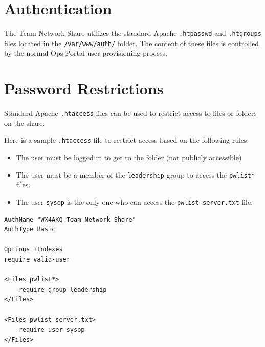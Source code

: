 \documentclass[pdflatex,letterpaper,twoside,12pt]{book}
\begin{document}

\section{Authentication}

The Team Network Share utilizes the standard Apache \texttt{.htpasswd} and \texttt{.htgroups} files located in the \texttt{/var/www/auth/} folder.  The content of these files is controlled by the normal Ops Portal user provisioning process.


\section{Password Restrictions}

Standard Apache \texttt{.htaccess} files can be used to restrict access to files or folders on the share.

Here is a sample \texttt{.htaccess} file to restrict access based on the following rules:

\begin{itemize}
\item The user must be logged in to get to the folder (not publicly accessible)
\item The user must be a member of the \texttt{leadership} group to access the \texttt{pwlist*} files.
\item The user \texttt{sysop} is the only one who can access the \texttt{pwlist-server.txt} file.
\end{itemize}

\begin{verbatim}
AuthName "WX4AKQ Team Network Share"
AuthType Basic

Options +Indexes
require valid-user

<Files pwlist*>
	require group leadership
</Files>

<Files pwlist-server.txt>
	require user sysop
</Files>
\end{verbatim}

\end{document}
